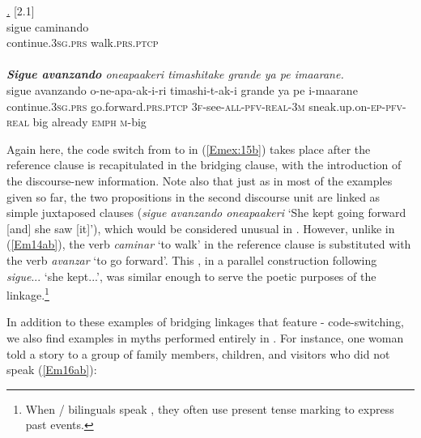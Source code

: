 \documentclass[output=paper]{LSP/langsci}
\begin{document}
\begin{exe}
\ex \label{Em15ab}
\begin{xlist}
\ex \label{Emex:15a}
\glt \textit{\underline{.}} [2.1]\\
\gll sigue caminando\\
 continue\textsc{.3sg.prs} walk\textsc{.prs.ptcp}\\
\glt {}\\
\ex \label{Emex:15b}
\glt \textit{\textbf{Sigue avanzando} oneapaakeri timashitake grande ya pe imaarane.}\\
\gll sigue avanzando o-ne-apa-ak-i-ri timashi-t-ak-i grande ya pe i-maarane\\     	      
    continue\textsc{.3sg.prs} go.forward\textsc{.prs.ptcp} \textsc{3f-}see\textsc{-all-pfv-real-3m} sneak.up.on\textsc{-ep-pfv-real} big already \textsc{emph} \textsc{m-}big\\
\glt {}
\end{xlist}
\end{exe}

Again here, the code switch from  to  in (\ref{Emex:15b}) takes place after the reference clause is recapitulated in the bridging clause, with the introduction of the discourse-new information. Note also that just as in most of the  examples given so far, the two propositions in the second discourse unit are linked as simple juxtaposed clauses (\textit{sigue avanzando oneapaakeri} `She kept going forward [and] she saw [it]'), which would be considered unusual in . However, unlike in (\ref{Em14ab}), the verb \textit{caminar} `to walk' in the reference clause is substituted with the verb \textit{avanzar} `to go forward'. This , in a parallel construction following \textit{sigue}... `she kept...', was similar enough to serve the poetic purposes of the linkage.\footnote{When / bilinguals speak , they often use present tense marking to express past events.}
 
 
In addition to these examples of bridging linkages that feature - code-switching, we also find examples in myths performed entirely in . For instance, one woman told a story to a group of family members, children, and visitors who did not speak  (\ref{Em16ab}):
\end{document}
